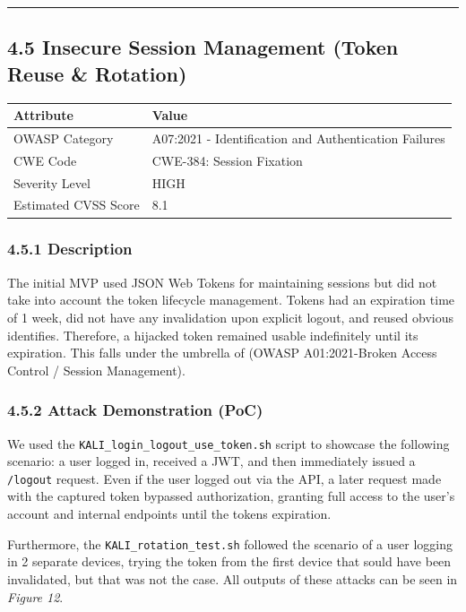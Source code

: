 \documentclass[11pt]{article}
\begin{document}
\vspace{1em}
\hrule
\vspace{1em}

\subsection*{4.5 Insecure Session Management (Token Reuse \& Rotation)}

\begin{table}[htbp]
\centering
\begin{tabular}{|l|l|}
\hline
\textbf{Attribute} & \textbf{Value} \\ \hline
OWASP Category & A07:2021 - Identification and Authentication Failures \\ \hline
CWE Code & CWE-384: Session Fixation \\ \hline
Severity Level & HIGH \\ \hline
Estimated CVSS Score & 8.1 \\ \hline
\end{tabular}
\end{table}

\subsubsection*{4.5.1 Description}

The initial MVP used JSON Web Tokens for maintaining sessions but did not take into account the token lifecycle management. Tokens had an expiration time of 1 week, did not have any invalidation upon explicit logout, and reused obvious identifies. Therefore, a hijacked token remained usable indefinitely until its expiration. This falls under the umbrella of (OWASP A01:2021-Broken Access Control / Session Management).

\subsubsection*{4.5.2 Attack Demonstration (PoC)}

We used the \texttt{KALI\_login\_logout\_use\_token.sh} script to showcase the following scenario: a user logged in, received a JWT, and then immediately issued a \texttt{/logout} request. Even if the user logged out via the API, a later request made with the captured token bypassed authorization, granting full access to the user's account and internal endpoints until the tokens expiration.

Furthermore, the \texttt{KALI\_rotation\_test.sh} followed the scenario of a user logging in 2 separate devices, trying the token from the first device that sould have been invalidated, but that was not the case. All outputs of these attacks can be seen in \textit{Figure 12}.
\end{document}
